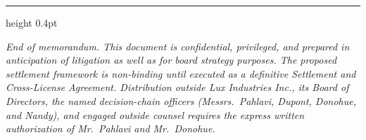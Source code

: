 \documentclass[11pt,letterpaper]{article}
\begin{document}
\vfill
\hrule height 0.4pt
\vspace{0.5em}
\begin{small}
\textit{End of memorandum. This document is confidential, privileged,
and prepared in anticipation of litigation as well as for board
strategy purposes. The proposed settlement framework is non-binding
until executed as a definitive Settlement and Cross-License Agreement.
Distribution outside Lux Industries Inc., its Board of Directors, the
named decision-chain officers (Messrs.\ Pahlavi, Dupont, Donohue, and
Nandy), and engaged outside counsel requires the express written
authorization of Mr.\ Pahlavi and Mr.\ Donohue.}
\end{small}
\end{document}
